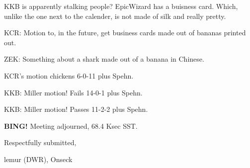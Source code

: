 \documentclass[10pt]{article}
\newcommand{\bing}{{\bf BING!} }
\newcommand{\ps}{ plus Spehn\xspace}
\newcommand{\onseck}{lemur (DWR), Onseck}
\begin{document}
KKB is apparently stalking people?  EpicWizard has a buisness card.
Which, unlike the one next to the calender, is not made of silk
and really pretty.

KCR: Motion to, in the future, get business cards made out of bananas
printed out.

ZEK: Something about a shark made out of a banana in Chinese.

KCR's motion chickens 6-0-11\ps.

KKB: Miller motion!  Fails 14-0-1\ps.

KKB: Miller motion!  Passes 11-2-2\ps.

\bing
\noindent
Meeting adjourned, 68.4 Ksec SST.

\vspace{18pt}

\centerline{Respectfully submitted,}
\centerline{\onseck}
\end{document}
